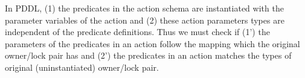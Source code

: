 



In PDDL, (1) the predicates in the action schema are instantiated
with the parameter variables of the action and 
(2) these action parameters types are independent of the predicate definitions.
Thus we must check if (1') the parameters of the predicates in an action follow the
mapping which the original owner/lock pair has and 
(2') the predicates in an action matches the types of original
(uninstantiated) owner/lock pair.%




